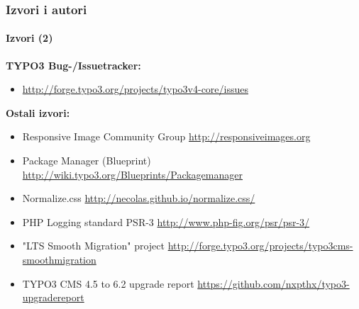 
\begin{frame}[fragile]
	\frametitle{Izvori i autori}
	\framesubtitle{Izvori (2)}

	\textbf{TYPO3 Bug-/Issuetracker:}
		\begin{itemize}\smaller
			\item \url{http://forge.typo3.org/projects/typo3v4-core/issues}
		\end{itemize}

	\textbf{Ostali izvori:}
		\begin{itemize}\smaller

			\item Responsive Image Community Group\newline
				\url{http://responsiveimages.org}

			\item Package Manager (Blueprint)\newline
				\url{http://wiki.typo3.org/Blueprints/Packagemanager}

			\item Normalize.css\newline
				\url{http://necolas.github.io/normalize.css/}

			\item PHP Logging standard PSR-3\newline
				\url{http://www.php-fig.org/psr/psr-3/}

			\item "LTS Smooth Migration" project\newline
				\url{http://forge.typo3.org/projects/typo3cms-smoothmigration}

			\item TYPO3 CMS 4.5 to 6.2 upgrade report
				\url{https://github.com/nxpthx/typo3-upgradereport}

		\end{itemize}

\end{frame}


